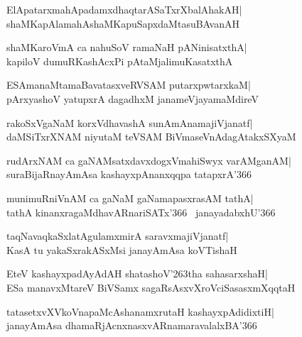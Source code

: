 \documentclass[twoside,12pt,openright]{book}
\def\S{\char'263}
\newcounter{shloka}[chapter]
\begin{document}
\begin{shloka}%
ElApatarxmahApadamxdhaqtarASaTxrXbalAhakAH|\\
shaMKapAlamahAshaMKapuSapxdaMtasuBAvanAH
\end{shloka}

\begin{shloka}%
shaMKaroVmA ca nahuSoV ramaNaH pANinisatxthA|\\
kapiloV dumuRKashAcxPi pAtaMjalimuKasatxthA
\end{shloka}

\begin{shloka}%
ESAmanaMtamaBavatasxveRVSAM putarxpwtarxkaM|\\
pArxyashoV yatupxrA dagadhxM janameVjayamaMdireV
\end{shloka}

\begin{shloka}%
rakoSxVgaNaM korxVdhavashA sunAmAnamajiVjanatf|\\
daMSiTxrXNAM niyutaM teVSAM BiVmaseVnAdagAtakxSXyaM
\end{shloka}

\begin{shloka}%
rudArxNAM ca gaNAMsatxdavxdogxVmahiSwyx varAMganAM|\\
suraBijaRnayAmAsa kashayxpAnanxqqpa tatapxrA\char'366
\end{shloka}

\begin{shloka}%
munimuRniVnAM ca gaNaM gaNamapasxrasAM tathA|\\
tathA kinanxragaMdhavARnariSATx\char'366~ janayadabxhU\char'366
\end{shloka}

\begin{shloka}%
taqNavaqkaSxlatAgulamxmirA saravxmajiVjanatf|\\
KasA tu yakaSxrakASxMsi janayAmAsa koVTishaH
\end{shloka}

\begin{shloka}%
EteV kashayxpadAyAdAH shatashoV\S tha sahasarxshaH|\\
ESa manavxMtareV BiVSamx sagaRsAsxvXroVciSasasxmXqqtaH
\end{shloka}

\begin{shloka}%
tatasetxvXVkoVnapaMcAshanamxrutaH kashayxpAdidixtiH|\\
janayAmAsa dhamaRjAcnxnasxvARnamaravalalxBA\char'366
\end{shloka}
\end{document}
